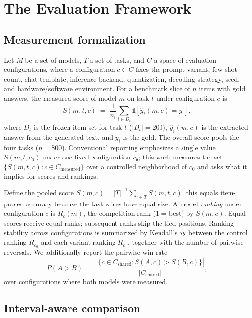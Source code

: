\section{The Evaluation Framework}
\label{sec:framework}

\subsection{Measurement formalization}

Let $M$ be a set of models, $T$ a set of tasks, and $C$ a space of
evaluation configurations, where a configuration $c \in C$ fixes the prompt
variant, few-shot count, chat template, inference backend, quantization,
decoding strategy, seed, and hardware/software environment. For a benchmark
slice of $n$ items with gold answers, the measured score of model $m$ on
task $t$ under configuration $c$ is
\begin{equation}
S(m, t, c) \;=\; \frac{1}{n_{t}} \sum_{i \in D_t} \mathbb{1}\!\left[
\hat{y}_i(m, c) = y_i \right],
\end{equation}
where $D_t$ is the frozen item set for task $t$ ($|D_t| = 200$),
$\hat{y}_i(m,c)$ is the extracted answer from the generated text, and $y_i$
is the gold. The overall score pools the four tasks ($n = 800$). Conventional
reporting emphasizes a single value $S(m, t, c_0)$ under one fixed
configuration $c_0$; this work measures the set
$\{S(m,t,c) : c \in C_{\text{measured}}\}$ over a controlled neighborhood of
$c_0$ and asks what it implies for scores and rankings.

Define the pooled score $\bar S(m,c)=|T|^{-1}\sum_{t\in T}S(m,t,c)$;
this equals item-pooled accuracy because the task slices have equal size.
A model \emph{ranking} under configuration $c$ is $R_c(m)$, the competition
rank (1 = best) by $\bar S(m,c)$. Equal scores receive equal ranks; subsequent
ranks skip the tied positions. Ranking stability across configurations is
summarized by Kendall's $\tau_b$ between the control ranking $R_{c_0}$ and
each variant ranking $R_c$ \citep{kendall1938new}, together with the number
of pairwise reversals. We additionally report the pairwise win rate
\begin{equation}
P(A > B) \;=\; \frac{\left|\{c \in C_{\text{shared}} : \bar S(A,c) > \bar S(B,c)\}\right|}{|C_{\text{shared}}|},
\end{equation}
over configurations where both models were measured.

\subsection{Interval-aware comparison}

